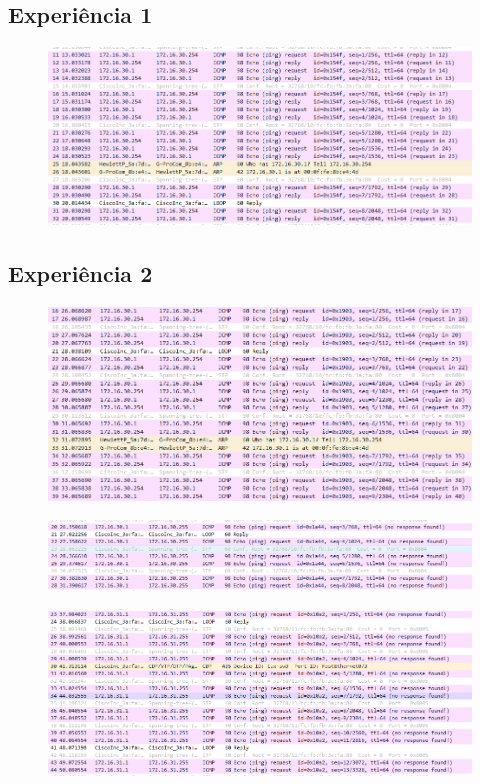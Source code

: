 \documentclass{article}
\begin{document}
\subsection{Experiência 1}
\begin{figure}[H]
\centering
\includegraphics[width=1.0\textwidth]{exp1-1.PNG}
\end{figure}
\subsection{Experiência 2}
\begin{figure}[H]
\centering
\includegraphics[width=1.0\textwidth]{exp2-1.PNG}
\end{figure}
\begin{figure}[H]
\centering
\includegraphics[width=1.0\textwidth]{exp2-2.PNG}
\end{figure}

\begin{figure}[H]
\centering
\includegraphics[width=1.0\textwidth]{exp2-3.PNG}
\end{figure}
\end{document}
